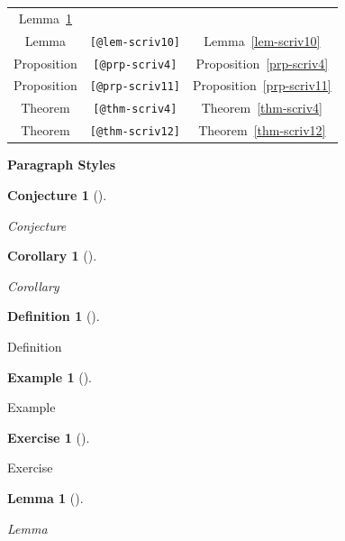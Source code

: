 \documentclass[
  12pt,
  a4paper,
  oneside,
  titlepage,
  toclink=all,
  toc=bibliography]{scrbook}
\theoremstyle{definition}
\newtheorem{definition}{Definition}[section]
\theoremstyle{plain}
\newtheorem{corollary}{Corollary}[section]
\theoremstyle{plain}
\newtheorem{conjecture}{Conjecture}[section]
\theoremstyle{plain}
\theoremstyle{plain}
\theoremstyle{definition}
\newtheorem{exercise}{Exercise}[section]
\theoremstyle{definition}
\newtheorem{example}{Example}[section]
\theoremstyle{plain}
\newtheorem{lemma}{Lemma}[section]
\theoremstyle{remark}
\begin{document}
\begin{longtable}[]{@{}ccc@{}}
\protect\hypertarget{cite_18}{}{\label{cite_18}Lemma~\ref{lem-scriv4}} \\
Lemma & \texttt{{[}@lem-scriv10{]}} &
\protect\hypertarget{cite_19}{}{\label{cite_19}Lemma~\ref{lem-scriv10}} \\
Proposition & \texttt{{[}@prp-scriv4{]}} &
\protect\hypertarget{cite_20}{}{\label{cite_20}Proposition~\ref{prp-scriv4}} \\
Proposition & \texttt{{[}@prp-scriv11{]}} &
\protect\hypertarget{cite_21}{}{\label{cite_21}Proposition~\ref{prp-scriv11}} \\
Theorem & \texttt{{[}@thm-scriv4{]}} &
\protect\hypertarget{cite_22}{}{\label{cite_22}Theorem~\ref{thm-scriv4}} \\
Theorem & \texttt{{[}@thm-scriv12{]}} &
\protect\hypertarget{cite_23}{}{\label{cite_23}Theorem~\ref{thm-scriv12}} \\
\end{longtable}

\textbf{Paragraph Styles}

\begin{conjecture}[]\protect\hypertarget{cnj-scriv4}{}\label{cnj-scriv4}

Conjecture

\end{conjecture}

\begin{corollary}[]\protect\hypertarget{cor-scriv4}{}\label{cor-scriv4}

Corollary

\end{corollary}

\begin{definition}[]\protect\hypertarget{def-scriv4}{}\label{def-scriv4}

Definition

\end{definition}

\begin{example}[]\protect\hypertarget{exm-scriv4}{}\label{exm-scriv4}

Example

\end{example}

\begin{exercise}[]\protect\hypertarget{exr-scriv4}{}\label{exr-scriv4}

Exercise

\end{exercise}

\begin{lemma}[]\protect\hypertarget{lem-scriv4}{}\label{lem-scriv4}

Lemma

\end{lemma}
\end{document}
